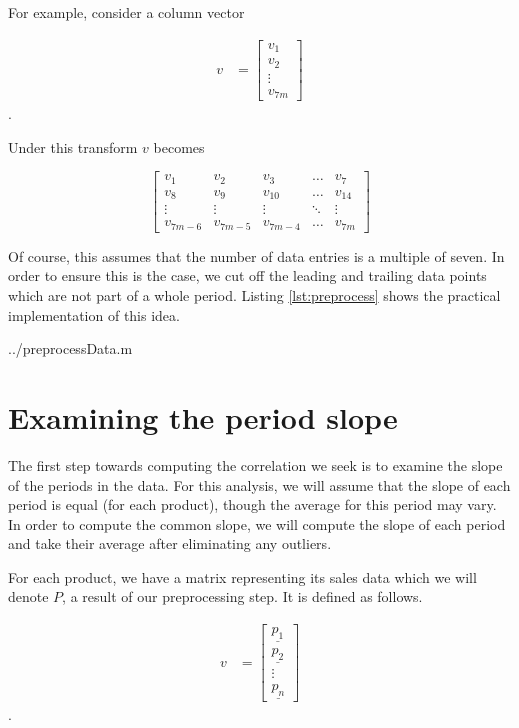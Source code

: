For example, consider a column vector 

\begin{align}
   v &= \begin{bmatrix}
           v_{1} \\
           v_{2} \\
           \vdots \\
           v_{7m}
         \end{bmatrix}
  \end{align}.

Under this transform $v$ becomes

\[
\begin{bmatrix}
    v_{1} & v_{2} & v_{3} & \dots  & v_{7} \\
    v_{8} & v_{9} & v_{10} & \dots  & v_{14} \\
    \vdots & \vdots & \vdots & \ddots & \vdots \\
    v_{7m-6} & v_{7m-5} & v_{7m -4} & \dots  & v_{7m}
\end{bmatrix}
\]

Of course, this assumes that the number of data entries is a multiple of seven. In order to ensure this is the case, we cut off the leading and trailing data points which are not part of a whole period. Listing \ref{lst:preprocess} shows the practical implementation of this idea.

  {../preprocessData.m}

\section{Examining the period slope}

The first step towards computing the correlation we seek is to examine the slope of the periods in the data. For this analysis, we will assume that the slope of each period is equal (for each product), though the average for this period may vary. In order to compute the common slope, we will compute the slope of each period and take their average after eliminating any outliers.

For each product, we have a matrix representing its sales data which we will denote $P$, a result of our preprocessing step. It is defined as follows.

\begin{align}
   v &= \begin{bmatrix}
           \underline{p_{1}} \\
           \underline{p_{2}} \\
           \vdots \\
           \underline{p_{n}}
         \end{bmatrix}
  \end{align}.

